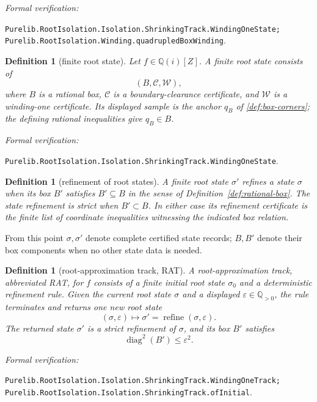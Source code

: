 \documentclass[11pt]{article}
\newtheorem{definition}[theorem]{Definition}
\newcommand{\Qi}{\mathbb{Q}(i)}
\newcommand{\Q}{\mathbb{Q}}
\newcommand{\diamq}{\operatorname{diag}^{2}}
\newcommand{\eps}{\varepsilon}
\newcommand{\Defref}[1]{Definition~\ref{#1}}
\newcommand{\leanref}[1]{\par\smallskip\noindent
  \emph{Formal verification:}\par\nobreak
  {\raggedright\nolinkurl{#1}.\par}}
\begin{document}
\leanref{Purelib.RootIsolation.Isolation.ShrinkingTrack.WindingOneState;
Purelib.RootIsolation.Winding.quadrupledBoxWinding}

\begin{definition}[finite root state]
\label{def:finite-root-state}
Let $f\in\Qi[Z]$.  A \emph{finite root state} consists of
\[
       (B,\mathcal C,\mathcal W),
\]
where $B$ is a rational box, $\mathcal C$ is a boundary-clearance
certificate, and $\mathcal W$ is a winding-one certificate.
Its displayed sample is the anchor $q_B$ of
\cref{def:box-corners}; the defining rational inequalities give
$q_B\in B$.
\end{definition}

\leanref{Purelib.RootIsolation.Isolation.ShrinkingTrack.WindingOneState}

\begin{definition}[refinement of root states]
\label{def:root-state-refinement}
A finite root state $\sigma'$ \emph{refines} a state $\sigma$ when its box
$B'$ satisfies $B'\subseteq B$ in the sense of
\Defref{def:rational-box}.  The state refinement is \emph{strict} when
$B'\subset B$.  In either case its refinement certificate is the finite list
of coordinate inequalities witnessing the indicated box relation.
\end{definition}

From this point $\sigma,\sigma'$ denote complete certified state records;
$B,B'$ denote their box components when no other state data is needed.

\begin{definition}[root-approximation track, RAT]
\label{def:rat}
A \emph{root-approximation track}, abbreviated \emph{RAT}, for $f$ consists
of a finite initial root state $\sigma_0$ and a deterministic refinement rule.
Given the current root state $\sigma$ and a displayed $\eps\in\Q_{>0}$, the rule
terminates and returns one new root state
\[
                    (\sigma,\eps)\longmapsto
                    \sigma'=\operatorname{refine}(\sigma,\eps).
\]
The returned state $\sigma'$ is a strict refinement of $\sigma$, and its box $B'$
satisfies
\[
                  \diamq(B')\le\eps^2.
\]
\end{definition}

\leanref{Purelib.RootIsolation.Isolation.ShrinkingTrack.WindingOneTrack;
Purelib.RootIsolation.Isolation.ShrinkingTrack.ofInitial}
\end{document}

